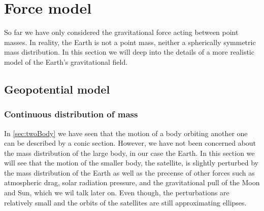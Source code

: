 \documentclass[../main.tex]{subfiles}
\begin{document}
\section{Force model}\label{sec:force}
So far we have only considered the gravitational force acting between point masses. In reality, the Earth is not a point mass, neither a spherically symmetric mass distribution. In this section we will deep into the details of a more realistic model of the Earth's gravitational field.
\subsection{Geopotential model}
\subsubsection{Continuous distribution of mass}
In \cref{sec:twoBody} we have seen that the motion of a body orbiting another one can be described by a conic section. However, we have not been concerned about the mass distribution of the large body, in our case the Earth. In this section we will see that the motion of the smaller body, the satellite, is slightly perturbed by the mass distribution of the Earth as well as the precense of other forces such as atmospheric drag, solar radiation pressure, and the gravitational pull of the Moon and Sun, which we wil talk later on. Even though, the perturbations are relatively small and the orbits of the satellites are still approximating ellipses.
\end{document}
